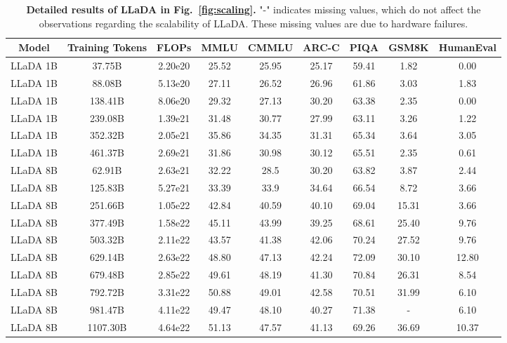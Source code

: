 \documentclass{article}
\begin{document}
\begin{table}[t!]
    \centering 
    \caption{\textbf{Detailed results of LLaDA in Fig.~\ref{fig:scaling}.} "-" indicates missing values, which do not affect the observations regarding the scalability of LLaDA. These missing values are due to hardware failures. } 
    \label{tab:scaling_llada}
    \vspace{0.2cm}
    \begin{adjustbox}{max width=\textwidth}
    \begin{tabular}{ccc|cccccc}
    \toprule
    Model & Training Tokens & FLOPs & MMLU & CMMLU & ARC-C & PIQA & GSM8K & HumanEval \\
    \midrule
    LLaDA 1B & 37.75B & 2.20e20 & 25.52 & 25.95 & 25.17 & 59.41 & 1.82 & 0.00 \\
    LLaDA 1B & 88.08B & 5.13e20 & 27.11 & 26.52 & 26.96 & 61.86 & 3.03 & 1.83 \\
    LLaDA 1B & 138.41B & 8.06e20 & 29.32 & 27.13 & 30.20 & 63.38 & 2.35 & 0.00 \\
    LLaDA 1B & 239.08B & 1.39e21 & 31.48 & 30.77 & 27.99 & 63.11 & 3.26 & 1.22 \\
    LLaDA 1B & 352.32B & 2.05e21 & 35.86 & 34.35 & 31.31 & 65.34 & 3.64 & 3.05 \\
    LLaDA 1B & 461.37B & 2.69e21 & 31.86 & 30.98 & 30.12 & 65.51 & 2.35 & 0.61 \\
    LLaDA 8B & 62.91B & 2.63e21 & 32.22 & 28.5 & 30.20 & 63.82 & 3.87 & 2.44 \\
    LLaDA 8B & 125.83B & 5.27e21 & 33.39 & 33.9 & 34.64 & 66.54 & 8.72 & 3.66 \\
    LLaDA 8B & 251.66B & 1.05e22 & 42.84 & 40.59 & 40.10 & 69.04 & 15.31 & 3.66 \\
    LLaDA 8B & 377.49B & 1.58e22 & 45.11 & 43.99 & 39.25 & 68.61 & 25.40 & 9.76 \\
    LLaDA 8B & 503.32B & 2.11e22 & 43.57 & 41.38 & 42.06 & 70.24 & 27.52 & 9.76 \\
    LLaDA 8B & 629.14B & 2.63e22 & 48.80 & 47.13 & 42.24 & 72.09 & 30.10 & 12.80 \\
    LLaDA 8B & 679.48B & 2.85e22 & 49.61 & 48.19 & 41.30 & 70.84 & 26.31 & 8.54 \\
    LLaDA 8B & 792.72B & 3.31e22 & 50.88 & 49.01 & 42.58 & 70.51 & 31.99 & 6.10 \\
    LLaDA 8B & 981.47B & 4.11e22 & 49.47 & 48.10 & 40.27 & 71.38 & - & 6.10 \\
    LLaDA 8B & 1107.30B & 4.64e22 & 51.13 & 47.57 & 41.13 & 69.26 & 36.69 & 10.37 \\

\end{tabular}
\end{adjustbox}
\end{table}
\end{document}
